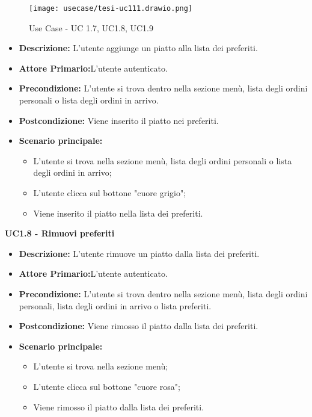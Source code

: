 \begin{figure}[H]
    \centering
    \texttt{[image: usecase/tesi-uc111.drawio.png]}
    \caption{Use Case - UC 1.7, UC1.8, UC1.9}
\end{figure}
\begin{itemize}
    \item \textbf{Descrizione:} L'utente aggiunge un piatto alla lista dei preferiti.
    \item \textbf{Attore Primario:}L'utente autenticato.
    \item \textbf{Precondizione:} L'utente si trova dentro nella sezione menù, lista degli ordini personali o lista degli ordini in arrivo.
    \item \textbf{Postcondizione:} Viene inserito il piatto nei preferiti.
    \item \textbf{Scenario principale:}
    \begin{itemize}
        \item L'utente si trova nella sezione menù, lista degli ordini personali o lista degli ordini in arrivo;
        \item L'utente clicca sul bottone "cuore grigio";
        \item Viene inserito il piatto nella lista dei preferiti.
    \end{itemize}
\end{itemize}
\textbf{UC1.8 - Rimuovi preferiti}
\begin{itemize}
    \item \textbf{Descrizione:} L'utente rimuove un piatto dalla lista dei preferiti.
    \item \textbf{Attore Primario:}L'utente autenticato.
    \item \textbf{Precondizione:} L'utente si trova dentro nella sezione menù, lista degli ordini personali, lista degli ordini in arrivo o lista preferiti.
    \item \textbf{Postcondizione:} Viene rimosso il piatto dalla lista dei preferiti.
    \item \textbf{Scenario principale:}
    \begin{itemize}
        \item L'utente si trova nella sezione menù;
        \item L'utente clicca sul bottone "cuore rosa";
        \item Viene rimosso il piatto dalla lista dei preferiti.
    \end{itemize}
\end{itemize}
